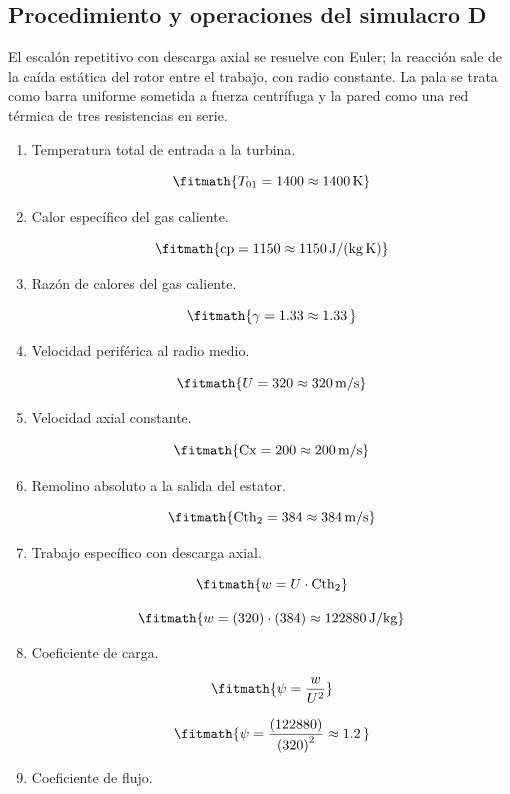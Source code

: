 \subsection*{Procedimiento y operaciones del simulacro D}
El escalón repetitivo con descarga axial se resuelve con Euler; la reacción sale de la caída estática del rotor entre el trabajo, con radio constante. La pala se trata como barra uniforme sometida a fuerza centrífuga y la pared como una red térmica de tres resistencias en serie.

\begin{enumerate}

\item Temperatura total de entrada a la turbina.

\[\fitmath{T_{01}=1400\approx 1400\,\mathrm{K}}\]

\item Calor específico del gas caliente.

\[\fitmath{\mathrm{cp}=1150\approx 1150\,\mathrm{J/(kg\,K)}}\]

\item Razón de calores del gas caliente.

\[\fitmath{\gamma=1.33\approx 1.33\,}\]

\item Velocidad periférica al radio medio.

\[\fitmath{U=320\approx 320\,\mathrm{m/s}}\]

\item Velocidad axial constante.

\[\fitmath{\mathrm{Cx}=200\approx 200\,\mathrm{m/s}}\]

\item Remolino absoluto a la salida del estator.

\[\fitmath{\mathrm{Cth}_{2}=384\approx 384\,\mathrm{m/s}}\]

\item Trabajo específico con descarga axial.

\[\fitmath{w=U\cdot \mathrm{Cth}_{2}}\]

\[\fitmath{w=(320)\cdot (384)\approx 122880\,\mathrm{J/kg}}\]

\item Coeficiente de carga.

\[\fitmath{\psi=\frac{w}{{U}^{2}}}\]

\[\fitmath{\psi=\frac{(122880)}{{(320)}^{2}}\approx 1.2\,}\]

\item Coeficiente de flujo.


\end{enumerate}
